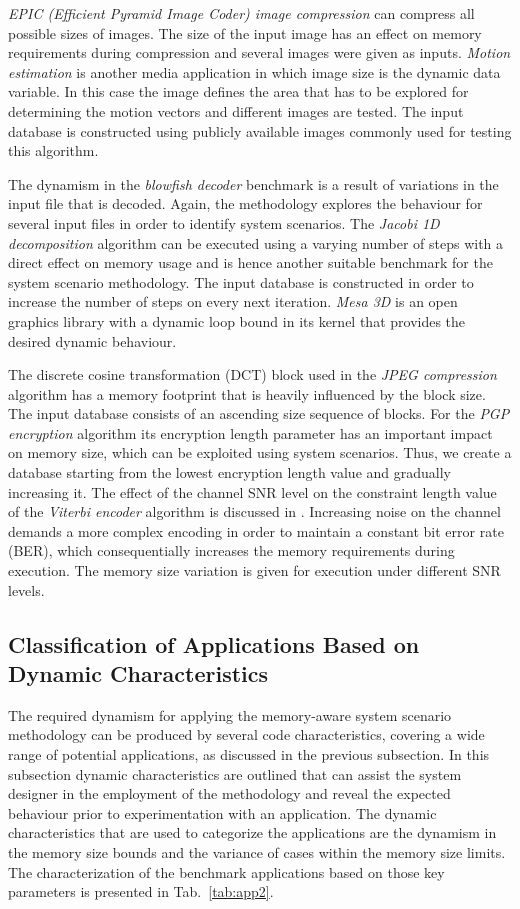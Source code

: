 \documentclass[smallextended]{svjour3}
\begin{document}
\textit{EPIC (Efficient Pyramid Image Coder) image compression} can compress all possible sizes of images. 
The size of the input image has an effect on memory requirements during compression and several images were given as inputs. 
\textit{Motion estimation} is another media application in which image size is the dynamic data variable. 
In this case the image defines the area that has to be explored for determining the motion vectors and different images are tested. 
The input database is constructed using publicly available images commonly used for testing this algorithm.

The dynamism in the \textit{blowfish decoder} benchmark is a result of variations in the input file that is decoded. 
Again, the methodology explores the behaviour for several input files in order to identify system scenarios. 
The \textit{Jacobi 1D decomposition} algorithm can be executed using a varying number of steps with a direct effect on memory usage and is hence another suitable benchmark for the system scenario methodology. 
The input database is constructed in order to increase the number of steps on every next iteration. 
\textit{Mesa 3D} is an open graphics library with a dynamic loop bound in its kernel that provides the desired dynamic behaviour. 

The discrete cosine transformation (DCT) block used in the \textit{JPEG compression} algorithm has a memory footprint that is heavily influenced by the block size. 
The input database consists of an ascending size sequence of blocks. 
For the \textit{PGP encryption} algorithm its encryption length parameter has an important impact on memory size, which can be exploited using system scenarios. 
Thus, we create a database starting from the lowest encryption length value and gradually increasing it. 
The effect of the channel SNR level on the constraint length value of the \textit{Viterbi encoder} algorithm is discussed in \cite{Fil12}. 
Increasing noise on the channel demands a more complex encoding in order to maintain a constant bit error rate (BER), which consequentially increases the memory requirements during execution. 
The memory size variation is given for execution under different SNR levels.  

\subsection{Classification of Applications Based on Dynamic Characteristics}
\label{sec:categorisation}
The required dynamism for applying the memory-aware system scenario methodology can be produced by several code characteristics, covering a wide range of potential applications, as discussed in the previous subsection. 
In this subsection dynamic characteristics are outlined that can assist the system designer in the employment of the methodology and reveal the expected behaviour prior to experimentation with an application. 
The dynamic characteristics that are used to categorize the applications are the dynamism in the memory size bounds and the variance of cases within the memory size limits.
The characterization of the benchmark applications based on those key parameters is presented in Tab.~\ref{tab:app2}.
\end{document}
